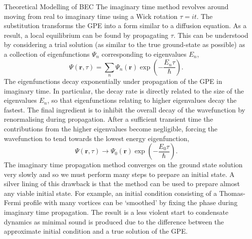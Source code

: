 \begin{chapter}{\label{cha:theoretical_model}Theoretical Modelling of BEC}
	The imaginary time method revolves around moving from real to imaginary time using a Wick rotation $\tau = it$. The substitution transforms the GPE into a form similar to a diffusion equation. As a result, a local equilibrium can be found by propagating $\tau$. This can be understood by considering a trial solution (as similar to the true ground-state as possible) as a collection of eigenfunctions $\Psi_n$ corresponding to eigenvalues $E_n$,
\begin{equation*}
\Psi(\mathbf{r},\tau) = \sum_n \Psi_n(\mathbf{r})\exp\left(-\frac{E_n\tau}{\hbar}\right).
\end{equation*}
The eigenfunctions decay exponentially under propagation of the GPE in imaginary time. In particular, the decay rate is directly related to the size of the eigenvalues $E_n$, so that eigenfunctions relating to higher eigenvalues decay the fastest. The final ingredient is to inhibit the overall decay of the wavefunction by renormalising during propagation. After a sufficient transient time the contributions from the higher eigenvalues become negligible, forcing the wavefunction to tend towards the lowest energy eigenfunction,
\begin{equation*}
\Psi(\mathbf{r},\tau) \rightarrow \Psi_0(\mathbf{r})\exp\left(-\frac{E_0\tau}{\hbar}\right).
\end{equation*}
The imaginary time propagation method converges on the ground state solution very slowly and so we must perform many steps to prepare an initial state. A silver lining of this drawback is that the method can be used to prepare almost any viable initial state. For example, an initial condition consisting of a Thomas-Fermi profile with many vortices can be `smoothed' by fixing the phase during imaginary time propagation. The result is a less violent start to condensate dynamics as minimal sound is produced due to the difference between the approximate initial condition and a true solution of the GPE.


\end{chapter}
